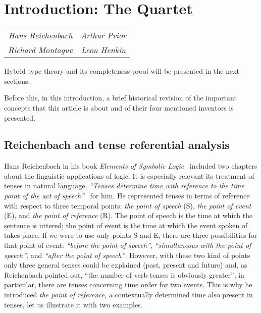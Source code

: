 \section{Introduction: The Quartet} \label{introduction}

\begin{center}
\begin{tabular}{cc}
\emph{Hans Reichenbach}
& \emph{Arthur Prior}\\
\emph{Richard Montague}
&\emph{Leon Henkin}
\end{tabular}%
\end{center}%

Hybrid type theory and its completeness proof will be presented in the next
sections.

Before this, in this introduction, a brief historical revision of the
important concepts that this article is about and of their four mentioned
inventors is presented.

\subsection{Reichenbach and tense referential analysis}

Hans Reichenbach in his book \emph{Elements of Symbolic 
Logic}~\cite{Reichenbach1947} included two chapters about the linguistic applications
of logic. It is especially relevant its treatment of tenses in natural
language. \emph{``Tenses determine time with reference to
the time point of the act of 
speech''}~\cite{Reichenbach1947} for him. He represented tenses in terms of reference with respect to
three temporal points: \emph{the point of speech} (S), \emph{the point
of event} (E), and \emph{the point of reference} (R). The point of speech
is the time at which the sentence is uttered; the point of event is the time
at which the event spoken of takes place. If we were to use only points S
and E, there are three possibilities for that point of event:
\emph{``before the point of speech''},
\emph{``simultaneous with the point of speech''}, 
and \emph{``after the point of speech''}. However, with these two kind of points only three
general tenses could be explained (past, present and future) and, as
Reichenbach pointed out, ``the number of verb tenses is
obviously greater''; in particular, there are tenses
concerning time order for two events. This is why he introduced \emph{the
point of reference}, a contextually determined time also present in tenses,
let us illustrate it with two examples.

